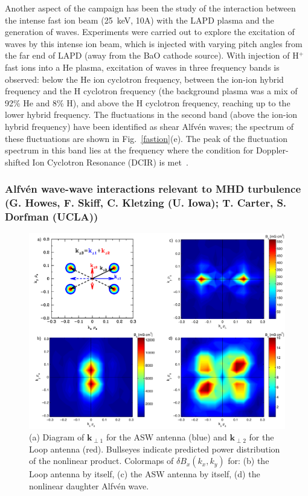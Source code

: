 \documentclass[11pt]{article}
\newcommand\Alfven{Alfv\'en }
\newcommand{\V}[1]{\mathbf{#1}}
\renewcommand{\cite}{\citep}
\begin{document}
Another aspect of the campaign has been the study of the interaction
between the intense fast ion beam (25~keV, 10A) with the LAPD plasma and the
generation of waves.   Experiments were carried out to explore the excitation of waves by
this intense ion beam, which is injected with varying pitch angles
from the far end of LAPD (away from the BaO cathode source).  With
injection of H$^+$ fast ions into a He plasma, excitation of waves in
three frequency bands is observed:  below the He ion cyclotron
frequency, between the ion-ion hybrid frequency and the H cyclotron
frequency (the background plasma was a mix of 92\% He and 8\% H), and
above the H cyclotron frequency, reaching up to the lower hybrid
frequency.  The fluctuations in the second band (above the ion-ion
hybrid frequency) have been identified as shear Alfv\'{e}n waves; the
spectrum of these fluctuations are shown in Fig.~\ref{fastion}(e).
The peak of the fluctuation spectrum in this band lies at the
frequency where the condition for Doppler-shifted Ion Cyclotron
Resonance (DCIR) is met~\cite{tripathi:2015}.


\subsubsection{Alfv\'{e}n wave-wave interactions relevant to MHD turbulence (G.
Howes, F. Skiff, C. Kletzing (U. Iowa); T. Carter, S. Dorfman (UCLA))}

\begin{figure}
\begin{center}
\includegraphics[width=3.5truein]{iowa}
\caption{ (a) Diagram of $\V{k}_{\perp 1}$ for the ASW
antenna (blue) and  $\V{k}_{\perp 2}$ for the Loop antenna (red). Bullseyes indicate predicted
power distribution of the nonlinear product.  Colormaps
of $\delta B_x(k_x,k_y)$ for: (b) the Loop antenna by itself, (c) the
ASW antenna by itself, (d) the nonlinear daughter \Alfven wave.}\label{iowa}
\end{center}
\end{figure}
\end{document}
